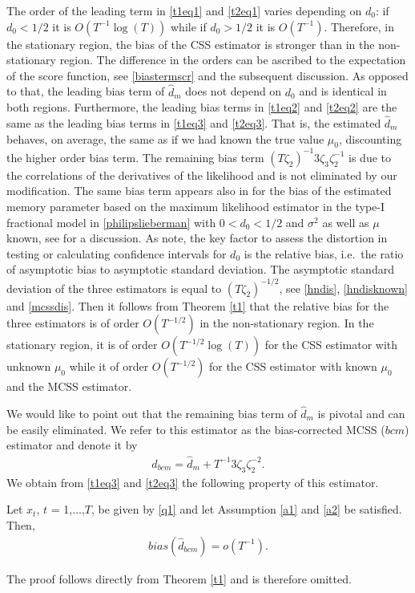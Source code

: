 {{The order of the leading term in \eqref{t1eq1} and \eqref{t2eq1} varies depending on $d_0$: if $d_0 < 1/2$ it is $O(T^{-1}\log(T))$ while if $d_0 > 1/2$ it is $O(T^{-1})$. Therefore, in the stationary region, the bias of the CSS estimator is stronger than in the non-stationary region. The difference in the orders can be ascribed to the expectation of the score function, see \eqref{biastermscr} and the subsequent discussion. As opposed to that, the leading bias term of $\hat{d}_m$ does not depend on $d_0$ and is identical in both regions. Furthermore, the leading bias terms in \eqref{t1eq2} and \eqref{t2eq2} are the same as the leading bias terms in \eqref{t1eq3} and \eqref{t2eq3}. That is, the estimated $\hat{d}_m$ behaves, on average, the same as if we had known the true value $\mu_0$, discounting the higher order bias term. The remaining bias term $(T \zeta_{2})^{-1}3 \zeta_{3} \zeta_{2}^{-1}$ is due to the correlations of the derivatives of the likelihood and is not eliminated by our modification. The same bias term appears also in \textcite{lieberman2004expansions} for the bias of the estimated memory parameter based on the maximum likelihood estimator in the type-I fractional model in \eqref{philipslieberman} with $0 < d_0 < 1/2$ and $\sigma^2$ as well as $\mu$ known, see \textcite[p.\ 1106]{johansen2016role} for a discussion. As \textcite[p.\ 1108]{johansen2016role} note, the key factor to assess the distortion in testing or calculating confidence intervals for $d_0$ is the relative bias, i.e.\ the ratio of asymptotic bias to asymptotic standard deviation. The asymptotic standard deviation of the three estimators is equal to $(T \zeta_{2})^{-1/2}$, see \eqref{hndis}, \eqref{hndisknown} and \eqref{mcssdis}. Then it follows from Theorem \ref{t1} that the relative bias for the three estimators is of order $O(T^{-1/2})$ in the non-stationary region. In the stationary region, it is of order $O(T^{-1/2} \log(T))$ for the CSS estimator with unknown $\mu_0$ while it of order $O(T^{-1/2})$ for the CSS estimator with known $\mu_0$ and the MCSS estimator.    


We would like to point out that the remaining bias term of $\hat{d}_m$ is pivotal and can be easily eliminated. We refer to this estimator as the bias-corrected MCSS ($bcm$) estimator and denote it by
\begin{align}
    \hat{d}_{bcm} = \hat{d}_{m} + T^{-1} 3\zeta_3 \zeta_2^{-2}.\label{bcmcc}
\end{align}
We obtain from \eqref{t1eq3} and \eqref{t2eq3} the following property of this estimator.
\begin{corollary} \label{bcmcorr}
Let $x_t$, $t$ = 1,$\ldots$,$T$, be given by \eqref{q1} and let Assumption \ref{a1} and \ref{a2} be satisfied. Then, 
\begin{align*}
bias(\hat{d}_{bcm}) = o(T^{-1}). 
\end{align*}
\end{corollary}
The proof follows directly from Theorem \ref{t1} and is therefore omitted.


}}
